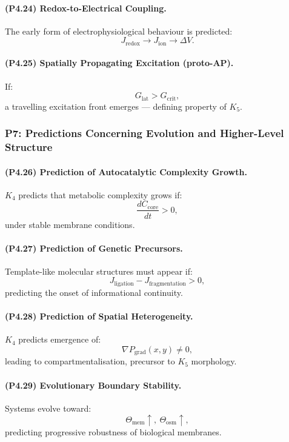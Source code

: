 \paragraph{(P4.24) Redox-to-Electrical Coupling.}
The early form of electrophysiological behaviour is predicted:
\[
J_{\mathrm{redox}} \to J_{\mathrm{ion}} \to \Delta V.
\]

\paragraph{(P4.25) Spatially Propagating Excitation (proto-AP).}
If:
\[
G_{\mathrm{lat}} > G_{\mathrm{crit}},
\]
a travelling excitation front emerges — defining property of $K_5$.

\subsubsection{P7: Predictions Concerning Evolution and Higher-Level Structure}

\paragraph{(P4.26) Prediction of Autocatalytic Complexity Growth.}
$K_4$ predicts that metabolic complexity grows if:
\[
\frac{dC_{\mathrm{core}}}{dt} > 0,
\]
under stable membrane conditions.

\paragraph{(P4.27) Prediction of Genetic Precursors.}
Template-like molecular structures must appear if:
\[
J_{\mathrm{ligation}} - J_{\mathrm{fragmentation}} > 0,
\]
predicting the onset of informational continuity.

\paragraph{(P4.28) Prediction of Spatial Heterogeneity.}
$K_4$ predicts emergence of:
\[
\nabla P_{\mathrm{grad}}(x,y) \neq 0,
\]
leading to compartmentalisation, precursor to $K_5$ morphology.

\paragraph{(P4.29) Evolutionary Boundary Stability.}
Systems evolve toward:
\[
\Theta_{\mathrm{mem}} \uparrow,\ \Theta_{\mathrm{osm}} \uparrow,
\]
predicting progressive robustness of biological membranes.

